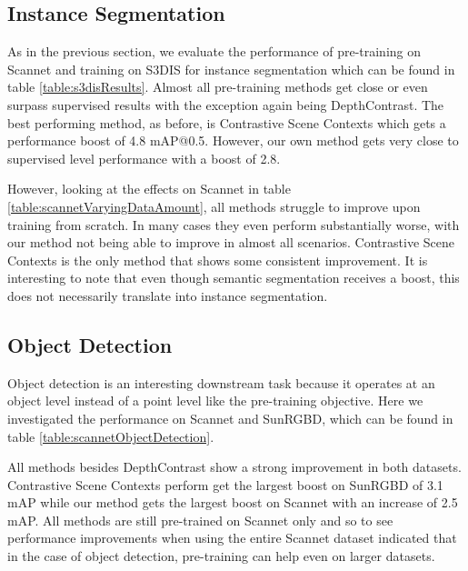 \documentclass[10pt,twocolumn,letterpaper]{article}
\begin{document}
\subsection{Instance Segmentation}
\label{sec:results:instance}

As in the previous section, we evaluate the performance of pre-training on Scannet and training on S3DIS for instance segmentation which can be found in table \ref{table:s3disResults}. Almost all pre-training methods get close or even surpass supervised results with the exception again being DepthContrast. The best performing method, as before, is Contrastive Scene Contexts which gets a performance boost of 4.8 mAP@0.5. However, our own method gets very close to supervised level performance with a boost of 2.8.

However, looking at the effects on Scannet in table \ref{table:scannetVaryingDataAmount}, all methods struggle to improve upon training from scratch. In many cases they even perform substantially worse, with our method not being able to improve in almost all scenarios. Contrastive Scene Contexts is the only method that shows some consistent improvement. It is interesting to note that even though semantic segmentation receives a boost, this does not necessarily translate into instance segmentation.

\subsection{Object Detection}
\label{sec:results:object}

Object detection is an interesting downstream task because it operates at an object level instead of a point level like the pre-training objective. Here we investigated the performance on Scannet and SunRGBD, which can be found in table \ref{table:scannetObjectDetection}.

All methods besides DepthContrast show a strong improvement in both datasets. Contrastive Scene Contexts perform get the largest boost on SunRGBD of 3.1 mAP while our method gets the largest boost on Scannet with an increase of 2.5 mAP. All methods are still pre-trained on Scannet only and so to see performance improvements when using the entire Scannet dataset indicated that in the case of object detection, pre-training can help even on larger datasets.
\end{document}
